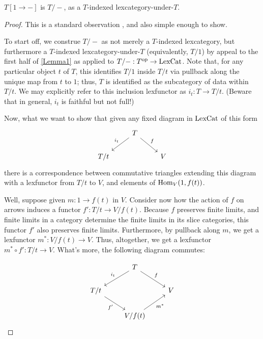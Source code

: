 \begin{lemma}\label{Lemma2}
$T[1 \to -]$ is $T/-$, as a $T$-indexed lexcategory-under-$T$.
\end{lemma}
\begin{proof}
This is a standard observation , and also simple enough to show. 

To start off, we construe $T/-$ as not merely a $T$-indexed lexcategory, but furthermore a $T$-indexed lexcategory-under-$T$ (equivalently, $T/1$) by appeal to the first half of \cref{Lemma1} as applied to $T/- : T^{\mathrm{op}} \to \mathrm{LexCat}$. Note that, for any particular object $t$ of $T$, this identifies $T/1$ inside $T/t$ via pullback along the unique map from $t$ to $1$; thus, $T$ is identified as the subcategory of  data within $T/t$. We may explicitly refer to this inclusion lexfunctor as $i_t : T \to T/t$. (Beware that in general, $i_t$ is faithful but not full!)

Now, what we want to show that given any fixed diagram in $\mathrm{LexCat}$ of this form
\[\begin{tikzcd}
	& T \\
	{T/t} && V
	\arrow["{i_t}"', from=1-2, to=2-1]
	\arrow["f", from=1-2, to=2-3]
\end{tikzcd}\]
there is a correspondence between commutative triangles extending this diagram with a lexfunctor from $T/t$ to $V$, and elements of $\operatorname{Hom}_V(1, f(t))$.

Well, suppose given $m : 1 \to f(t)$ in $V$. Consider now how the action of $f$ on arrows induces a functor $f' : T/t \to V/f(t)$. Because $f$ preserves finite limits, and finite limits in a category determine the finite limits in its slice categories, this functor $f'$ also preserves finite limits. Furthermore, by pullback along $m$, we get a lexfunctor $m^* : V/f(t) \to V$. Thus, altogether, we get a lexfunctor $m^* \circ f' : T/t \to V$. What's more, the following diagram commutes:

\[\begin{tikzcd}
	& T \\
	{T/t} && V \\
	& {V/f(t)}
	\arrow["{i_t}"', from=1-2, to=2-1]
	\arrow["f", from=1-2, to=2-3]
	\arrow["{f'}"', from=2-1, to=3-2]
	\arrow["{m^*}"', from=3-2, to=2-3]
\end{tikzcd}\]


\end{proof}
